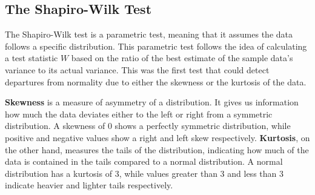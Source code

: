\documentclass[12pt]{article}
\begin{document}

\medskip


\subsection{The Shapiro-Wilk Test}\label{ShapiroWilk}

The Shapiro-Wilk test \cite{Shapiro1965} is a parametric test, meaning that it assumes the data follows a specific distribution. This parametric test follows the idea of calculating a test statistic $W$ based on the ratio of the best estimate of the sample data's variance to its actual variance. This was the first test that could detect departures from normality due to either the skewness or the kurtosis of the data.

\medskip
\noindent\textbf{Skewness} is a measure of asymmetry of a distribution. It gives us information how much the data deviates either to the left or right from a symmetric distribution. A skewness of 0 shows a perfectly symmetric distribution, while positive and negative values show a right and left skew respectively. \textbf{Kurtosis}, on the other hand, measures the tails of the distribution, indicating how much of the data is contained in the tails compared to a normal distribution. A normal distribution has a kurtosis of 3, while values greater than 3 and less than 3 indicate heavier and lighter tails respectively.
\end{document}
